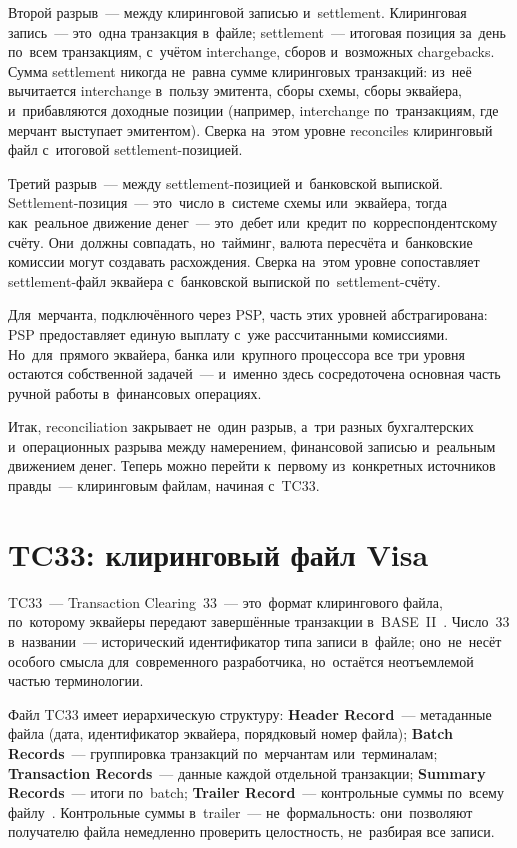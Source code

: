 Второй разрыв~--- между клиринговой записью и~settlement. Клиринговая
запись~--- это~одна транзакция в~файле; settlement~--- итоговая позиция
за~день по~всем транзакциям, с~учётом interchange, сборов и~возможных
chargebacks. Сумма settlement никогда не~равна сумме клиринговых
транзакций: из~неё вычитается interchange в~пользу эмитента, сборы схемы,
сборы эквайера, и~прибавляются доходные позиции (например, interchange
по~транзакциям, где мерчант выступает эмитентом). Сверка на~этом уровне
reconciles клиринговый файл с~итоговой settlement-позицией.

Третий разрыв~--- между settlement-позицией и~банковской выпиской.
Settlement-позиция~--- это~число в~системе схемы или~эквайера, тогда как~реальное
движение денег~--- это~дебет или~кредит по~корреспондентскому счёту.
Они~должны совпадать, но~тайминг, валюта пересчёта и~банковские комиссии
могут создавать расхождения. Сверка на~этом уровне сопоставляет
settlement-файл эквайера с~банковской выпиской по~settlement-счёту.

Для~мерчанта, подключённого через PSP, часть этих уровней абстрагирована:
PSP предоставляет единую выплату с~уже рассчитанными комиссиями.
Но~для~прямого эквайера, банка или~крупного процессора все три уровня
остаются собственной задачей~--- и~именно здесь сосредоточена основная
часть ручной работы в~финансовых операциях.


Итак, reconciliation закрывает не~один разрыв, а~три разных
бухгалтерских и~операционных разрыва между намерением,
финансовой записью и~реальным движением денег. Теперь можно
перейти к~первому из~конкретных источников правды~--- клиринговым
файлам, начиная с~TC33.

\section{TC33: клиринговый файл Visa}
\label{sec:recon-tc33}

TC33~--- Transaction Clearing~33~--- это~формат клирингового файла,
по~которому эквайеры передают завершённые транзакции в~BASE~II~.
Число~33 в~названии~--- исторический идентификатор типа записи в~файле;
оно~не~несёт особого смысла для~современного разработчика, но~остаётся
неотъемлемой частью терминологии.

Файл TC33 имеет иерархическую структуру: \textbf{Header Record}~---
метаданные файла (дата, идентификатор эквайера, порядковый номер файла);
\textbf{Batch Records}~--- группировка транзакций по~мерчантам или~терминалам;
\textbf{Transaction Records}~--- данные каждой отдельной транзакции;
\textbf{Summary Records}~--- итоги по~batch; \textbf{Trailer Record}~---
контрольные суммы по~всему файлу~. Контрольные
суммы в~trailer~--- не~формальность: они~позволяют получателю файла
немедленно проверить целостность, не~разбирая все записи.

